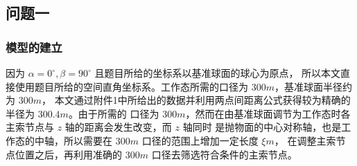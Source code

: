 \documentclass[withoutpreface,bwprint]{cumcmthesis} %
\begin{document}
\subsection{问题一}
\subsubsection{模型的建立}
因为 $\alpha = 0^\circ ,\beta = 90^\circ$ 且题目所给的坐标系以基准球面的球心为原点，
所以本文直接使用题目所给的空间直角坐标系。工作态所需的口径为 $300m$，基准球面半径约为 $300m$，
本文通过附件1中所给出的数据并利用两点间距离公式获得较为精确的半径为 $300.4m$。由于所需的
口径为 $300m$，然而在由基准球面调节为工作态时各主索节点与 $z$ 轴的距离会发生改变，而 $z$ 轴同时
是抛物面的中心对称轴，也是工作态的中轴，所以需要在 $300m$ 口径的范围上增加一定长度 $\xi m$，
在调整主索节点位置之后，再利用准确的 $300m$ 口径去筛选符合条件的主索节点。
\end{document}
